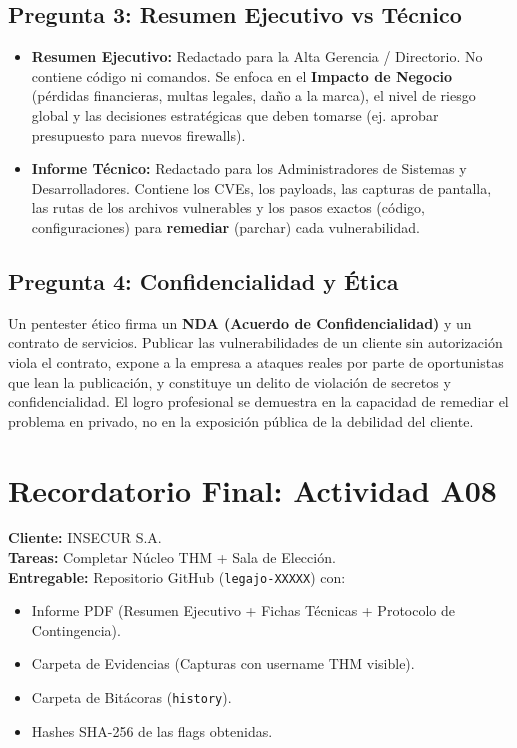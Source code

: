 \documentclass[11pt,a4paper]{article}
\begin{document}
\subsection*{Pregunta 3: Resumen Ejecutivo vs Técnico}
\begin{respuesta}
\begin{itemize}[leftmargin=*]
  \item \textbf{Resumen Ejecutivo:} Redactado para la Alta Gerencia / Directorio. No contiene código ni comandos. Se enfoca en el \textbf{Impacto de Negocio} (pérdidas financieras, multas legales, daño a la marca), el nivel de riesgo global y las decisiones estratégicas que deben tomarse (ej. aprobar presupuesto para nuevos firewalls).
  \item \textbf{Informe Técnico:} Redactado para los Administradores de Sistemas y Desarrolladores. Contiene los CVEs, los payloads, las capturas de pantalla, las rutas de los archivos vulnerables y los pasos exactos (código, configuraciones) para \textbf{remediar} (parchar) cada vulnerabilidad.
\end{itemize}
\end{respuesta}

\subsection*{Pregunta 4: Confidencialidad y Ética}
\begin{respuesta}
Un pentester ético firma un \textbf{NDA (Acuerdo de Confidencialidad)} y un contrato de servicios. Publicar las vulnerabilidades de un cliente sin autorización viola el contrato, expone a la empresa a ataques reales por parte de oportunistas que lean la publicación, y constituye un delito de violación de secretos y confidencialidad. El logro profesional se demuestra en la capacidad de remediar el problema en privado, no en la exposición pública de la debilidad del cliente.
\end{respuesta}

\section{Recordatorio Final: Actividad A08}
\begin{clave}
\textbf{Cliente:} INSECUR S.A.\\
\textbf{Tareas:} Completar Núcleo THM + Sala de Elección.\\
\textbf{Entregable:} Repositorio GitHub (\texttt{legajo-XXXXX}) con:
\begin{itemize}
  \item Informe PDF (Resumen Ejecutivo + Fichas Técnicas + Protocolo de Contingencia).
  \item Carpeta de Evidencias (Capturas con username THM visible).
  \item Carpeta de Bitácoras (\texttt{history}).
  \item Hashes SHA-256 de las flags obtenidas.
\end{itemize}
\end{clave}
\end{document}
